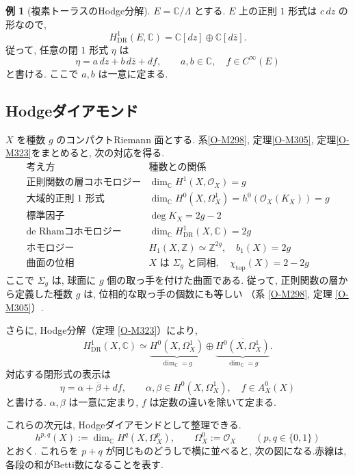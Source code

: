 \documentclass[dvipdfmx,a4paper,11pt]{article} %
\newcommand{\C}{\mathbb{C}}
\theoremstyle{definition}
\numberwithin{equation}{section}
\newtheorem{exa}[thm]{例}
\begin{document}
\begin{exa}[複素トーラスのHodge分解]
$E=\C/\Lambda$ とする.
$E$ 上の正則 $1$ 形式は $c\,dz$ の形なので, 
\[
H_{\mathrm{DR}}^1(E,\C)
=\C[dz]\oplus\C[d\overline z].
\]
従って, 任意の閉 $1$ 形式 $\eta$ は
\[
\eta=a\,dz+b\,d\overline z+df,
\qquad a,b\in\C,\quad f\in C^\infty(E)
\]
と書ける.
ここで $a,b$ は一意に定まる.
\end{exa}


\subsection{Hodgeダイアモンド}

$X$ を種数 $g$ のコンパクトRiemann 面とする. 系\ref{O-M298}, 定理\ref{O-M305}, 定理\ref{O-M323}をまとめると, 次の対応を得る.
\[
\begin{array}{c|c}
\text{考え方} & \text{種数との関係} \\ \hline
\text{正則関数の層コホモロジー}
& \dim_{\mathbb C}H^1(X,\mathcal O_X)=g \\[4pt]
\text{大域的正則 $1$ 形式}
& \dim_{\mathbb C}H^0(X,\Omega_X^1)
  =h^0(\mathcal O_X(K_X))=g \\[4pt]
\text{標準因子}
& \deg K_X=2g-2 \\[4pt]
\text{de Rhamコホモロジー}
& \dim_{\mathbb C}H_{\mathrm{DR}}^1(X,\mathbb C)=2g \\[4pt]
\text{ホモロジー}
& H_1(X,\mathbb Z)\simeq\mathbb Z^{2g},
  \quad b_1(X)=2g \\[4pt]
\text{曲面の位相}
& X\text{ は }\Sigma_g\text{ と同相},
  \quad \chi_{\mathrm{top}}(X)=2-2g
\end{array}
\]
ここで $\Sigma_g$ は, 球面に $g$ 個の取っ手を付けた曲面である.
従って, 正則関数の層から定義した種数 $g$ は, 
位相的な取っ手の個数にも等しい
（系 \ref{O-M298}, 定理 \ref{O-M305}）.

さらに, Hodge分解（定理 \ref{O-M323}）により, 
\[
H_{\mathrm{DR}}^1(X,\mathbb C)
\simeq
\underbrace{H^0(X,\Omega_X^1)}_{\dim_{\mathbb C}=g}
\oplus
\underbrace{\overline{H^0(X,\Omega_X^1)}}_{\dim_{\mathbb C}=g}.
\]
対応する閉形式の表示は
\[
\eta=\alpha+\overline{\beta}+df,
\qquad
\alpha,\beta\in H^0(X,\Omega_X^1),\quad
f\in A_X^0(X)
\]
と書ける.
$\alpha,\beta$ は一意に定まり, 
$f$ は定数の違いを除いて定まる.



これらの次元は, Hodgeダイアモンドとして整理できる.
\[
h^{p,q}(X):=\dim_{\mathbb C}H^q(X,\Omega_X^p),
\qquad
\Omega_X^0:=\mathcal O_X
\qquad(p,q\in\{0,1\})
\]
とおく.
これらを $p+q$ が同じものどうしで横に並べると, 
次の図になる.赤線は, 各段の和がBetti数になることを表す.
\end{document}
